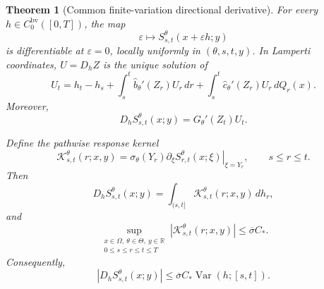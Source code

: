 \documentclass[11pt,reqno]{amsart}
\theoremstyle{plain}
\newtheorem{theorem}{Theorem}[section]
\theoremstyle{definition}
\newcommand{\R}{\mathbb R}
\newcommand{\eps}{\varepsilon}
\newcommand{\dd}{\,d}
\newcommand{\Var}{\operatorname{Var}}
\newcommand{\abs}[1]{\left\lvert #1\right\rvert}
\begin{document}
\begin{theorem}[Common finite-variation directional derivative]
\label{thm:bv-derivative}
For every \(h\in C_0^{\mathrm{bv}}([0,T])\), the map
\[
  \eps\longmapsto S_{s,t}^\theta(x+\eps h;y)
\]
is differentiable at \(\eps=0\), locally uniformly in
\((\theta,s,t,y)\).  In Lamperti coordinates, \(U=D_hZ\) is the unique
solution of
\begin{equation}\label{eq:Lamperti-directional-equation}
  U_t
  =h_t-h_s
  +\int_s^t\widehat b_\theta'(Z_r)U_r\dd r
  +\int_s^t\widehat c_\theta'(Z_r)U_r\dd Q_r(x).
\end{equation}
Moreover,
\begin{equation}\label{eq:S-directional-from-U}
  D_hS_{s,t}^\theta(x;y)
  =G_\theta'(Z_t)U_t.
\end{equation}

Define the pathwise response kernel
\begin{equation}\label{eq:response-kernel}
  \mathcal K_{s,t}^\theta(r;x,y)
  =
  \sigma_\theta(Y_r)
  \left.
    \partial_\xi S_{r,t}^\theta(x;\xi)
  \right|_{\xi=Y_r},
  \qquad s\le r\le t.
\end{equation}
Then
\begin{equation}\label{eq:response-representation}
  D_hS_{s,t}^\theta(x;y)
  =
  \int_{(s,t]}
  \mathcal K_{s,t}^\theta(r;x,y)\dd h_r,
\end{equation}
and
\begin{equation}\label{eq:response-kernel-bound}
  \sup_{\substack{x\in\Omega,\ \theta\in\Theta,\ y\in\R\\
                   0\le s\le r\le t\le T}}
  \abs{\mathcal K_{s,t}^\theta(r;x,y)}
  \le\overline\sigma C_*.
\end{equation}
Consequently,
\[
  \abs{D_hS_{s,t}^\theta(x;y)}
  \le\overline\sigma C_*\Var(h;[s,t]).
\]
\end{theorem}
\end{document}
